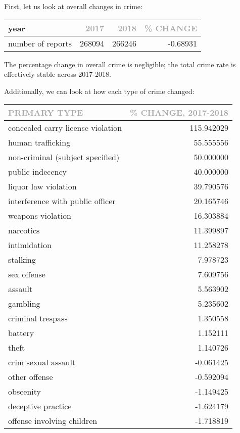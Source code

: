 \documentclass[11pt]{article}
\newcommand{\printsubsection}[1]{\normalfont\headerfontlt\textcolor{darkgray}{{#1}}}
\newcommand{\opns}[1]{\textrm{\small\printsubsection{\MakeUppercase{#1}}}}
\begin{document}
First, let us look at overall changes in crime:
\begin{table}[H]
\centering \renewcommand{\arraystretch}{1.2}
\begin{tabular}{l|rr|r}
year &    \opns{2017} &    \opns{2018} & \opns{\% change}\\\hline
number of reports    &  268094 &  266246 & -0.68931\\
\end{tabular}
\end{table}

The percentage change in overall crime is negligible; the total crime rate is effectively stable across 2017-2018.

\pagebreak 
Additionally, we can look at how each type of crime changed:

\begin{table}[H]
\centering \renewcommand{\arraystretch}{1.2}
\begin{tabular}{l|r}
  \opns{Primary Type}   &       \opns{\% Change, 2017-2018}  \\\hline
concealed carry license violation &  115.942029 \\
human trafficking &   55.555556 \\
non-criminal (subject specified) &   50.000000 \\
public indecency &   40.000000 \\
liquor law violation &   39.790576 \\
interference with public officer &   20.165746 \\
weapons violation &   16.303884 \\
narcotics &   11.399897 \\
intimidation &   11.258278 \\
stalking &    7.978723 \\
sex offense &    7.609756 \\
assault &    5.563902 \\
gambling &    5.235602 \\
criminal trespass &    1.350558 \\
battery &    1.152111 \\
theft &    1.140726 \\
crim sexual assault &   -0.061425 \\
other offense &   -0.592094 \\
obscenity &   -1.149425 \\
deceptive practice &   -1.624179 \\
offense involving children &   -1.718819 \\

\end{tabular}
\end{table}
\end{document}
